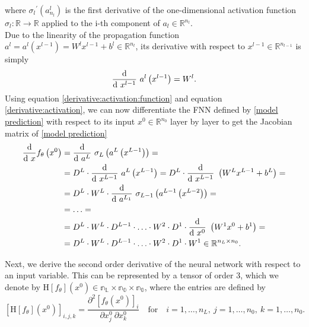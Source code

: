 where ${\sigma_{l}}^{\prime} \left( a^{l}_{n_l} \right)$ is the first derivative of the one-dimensional activation function $\sigma_{l} \colon \mathbb{R} \to \mathbb{R}$ applied to the i-th component of $a_l \in \mathbb{R}^{n_l}$. \\
Due to the linearity of the propagation function $a^l = a^l\left(x^{l-1}\right) = W^{l} x^{l-1} + b^{l} \in \mathbb{R}^{n_l}$, its derivative with respect to $x^{l-1} \in \mathbb{R}^{n_{l-1}}$ is simply
\begin{equation}
    \label{derivative:activation}
    \frac{\textup{d}}{\textup{d} \ x^{l-1}} \ a^{l}\left(x^{l-1}\right) = W^l.
\end{equation}
Using equation \cref{derivative:activation:function} and equation \cref{derivative:activation}, we can now differentiate the FNN defined by \cref{model prediction} with respect to its input $x^0 \in \mathbb{R}^{n_0}$ layer by layer to get the Jacobian matrix of \cref{model prediction}
\begin{align*}
    \frac{\textup{d}}{\textup{d} \ x} f_{\theta}\left(x^0\right) & = \frac{\textup{d}}{\textup{d} \ a^{L}} \ \sigma_{L} \left(a^{L}\left(x^{L-1}\right)\right) = \\
    & = D^L \cdot \frac{\textup{d}}{\textup{d} \ x^{L-1}} \ a^{L}\left(x^{L-1}\right) = D^L \cdot \frac{\textup{d}}{\textup{d} \ x^{L-1}} \ \left(W^{L} x^{L-1} + b^{L}\right) = \\
    & = D^L \cdot W^L \cdot \frac{\textup{d}}{\textup{d} \ a^{L_1}} \ \sigma_{L-1} \left(a^{L-1}\left(x^{L-2}\right)\right) = \\
    & = \ldots = \\
    & = D^L \cdot W^L \cdot D^{L-1} \cdot \ldots \cdot W^2 \cdot D^1 \cdot \frac{\textup{d}}{\textup{d} \ x^{0}} \ \left(W^{1} x^{0} + b^{1}\right) = \\
    & = D^L \cdot W^L \cdot D^{L-1} \cdot \ldots \cdot W^2 \cdot D^1 \cdot W^{1} \in \mathbb{R}^{n_L \times n_0}.
\end{align*}

Next, we derive the second order derivative of the neural network with respect to an input variable. This can be represented by a tensor of order 3, which we denote by $\mathrm{H} \left[f_{\theta} \right]\left(x^0\right) \in \mathbb{n_L \times n_0 \times n_0}$, where the entries are defined by
\begin{equation*}
    \left[ \mathrm{H} \left[f_{\theta} \right]\left(x^0\right) \right]_{i,j,k} = \frac{\partial^2 \left[f_{\theta}\left(x^0\right)\right]_i}{\partial x^0_{j} \ \partial x^0_{k}} \quad \text{for} \quad i = 1,\ldots, n_L, \ j = 1,\ldots, n_0, \ k = 1,\ldots, n_0.
\end{equation*}





